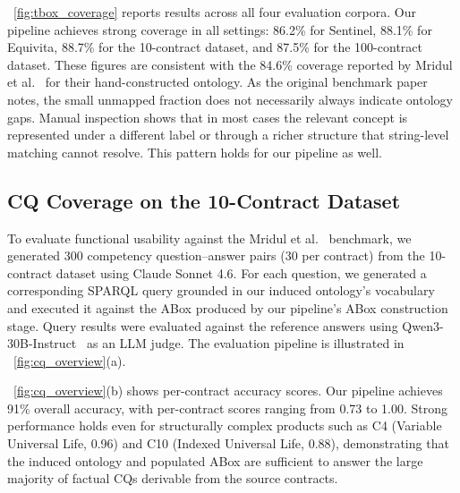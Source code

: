 \documentclass[sigconf]{acmart}
\begin{document}
~\autoref{fig:tbox_coverage} reports results across all four evaluation corpora. Our pipeline achieves strong coverage in all settings: 86.2\% for Sentinel, 88.1\% for Equivita, 88.7\% for the 10-contract dataset, and 87.5\% for the 100-contract dataset. These figures are consistent with the 84.6\% coverage reported by Mridul et al.~\cite{mridul2026benchmark} for their hand-constructed ontology. As the original benchmark paper notes, the small unmapped fraction does not necessarily always indicate ontology gaps. Manual inspection shows that in most cases the relevant concept is represented under a different label or through a richer structure that string-level matching cannot resolve. This pattern holds for our pipeline as well.

\subsection{CQ Coverage on the 10-Contract Dataset}

To evaluate functional usability against the Mridul et al.~\cite{mridul2026benchmark} benchmark, we generated 300 competency question--answer pairs (30 per contract) from the 10-contract dataset using Claude Sonnet 4.6. For each question, we generated a corresponding SPARQL query grounded in our induced ontology's vocabulary and executed it against the ABox produced by our pipeline's ABox construction stage. Query results were evaluated against the reference answers using Qwen3-30B-Instruct~\cite{qwen3technicalreport} as an LLM judge. The evaluation pipeline is illustrated in ~\autoref{fig:cq_overview}(a).

~\autoref{fig:cq_overview}(b) shows per-contract accuracy scores. Our pipeline achieves 91\% overall accuracy, with per-contract scores ranging from 0.73 to 1.00. Strong performance holds even for structurally complex products such as C4 (Variable Universal Life, 0.96) and C10 (Indexed Universal Life, 0.88), demonstrating that the induced ontology and populated ABox are sufficient to answer the large majority of factual CQs derivable from the source contracts.
\end{document}
